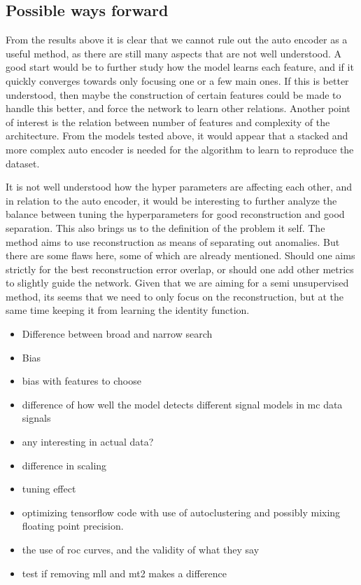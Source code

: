 \documentclass[ reprint, amsmath,amssymb, aps, nofootinbib]{revtex4-2}
\begin{document}
\subsection{Possible ways forward}
From the results above it is clear that we cannot rule out the auto encoder as a useful method, as there are still many aspects that are not well understood. A good start would be to further study how the model learns each feature, and if it quickly converges towards only focusing one or a few main ones. If this is better understood, then maybe the construction of certain features could be made to handle this better, and force the network to learn other relations. Another point of interest is the relation between number of features and complexity of the architecture. From the models tested above, it would appear that a stacked and more complex auto encoder is needed for the algorithm to learn to reproduce the dataset. \par 
It is not well understood how the hyper parameters are affecting each other, and in relation to the auto encoder, it would be interesting to further analyze the balance between tuning the hyperparameters for good reconstruction and good separation. This also brings us to the definition of the problem it self. The method aims to use reconstruction as means of separating out anomalies. But there are some flaws here, some of which are already mentioned. Should one aims strictly for the best reconstruction error overlap, or should one add other metrics to slightly guide the network. Given that we are aiming for a semi unsupervised method, its seems that we need to only focus on the reconstruction, but at the same time keeping it from learning the identity function. 


\newpage
\begin{itemize}
    \item Difference between broad and narrow search
    \item Bias 
    \item bias with features to choose
    \item difference of how well the model detects different signal models in mc data signals
    \item any interesting in actual data?
    \item difference in scaling
    \item tuning effect
    \item optimizing tensorflow code with use of autoclustering and possibly mixing floating point precision. 
    \item the use of roc curves, and the validity of what they say
    \item test if removing mll and mt2 makes a difference
    
\end{itemize}
\end{document}
